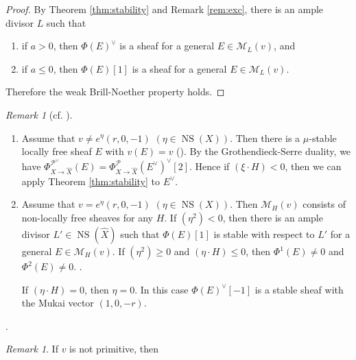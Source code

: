 \documentclass[10pt]{amsart}
\def\cal{\mathcal}
\newenvironment{NB}{
\color{red}{\bf NB}. \footnotesize 
}{}
\newcommand{\NS}{\operatorname{NS}}
\numberwithin{equation}{section}
\theoremstyle{plain}
\theoremstyle{definition}
\theoremstyle{remark}
\newtheorem{rem}[thm]{Remark}
\begin{document}
\begin{proof}
By Theorem \ref{thm:stability} and Remark \ref{rem:exc},
there is an ample divisor $L$ such that 
\begin{enumerate}
\item
if $a>0$, then $\Phi(E)^{\vee}$ is a sheaf for a general $E \in {\cal M}_L(v)$, and
\item
if $a \leq 0$, then $\Phi(E)[1]$ is a sheaf for a general $E \in {\cal M}_L(v)$.
\end{enumerate}
Therefore the weak Brill-Noether property holds.
\end{proof}


\begin{rem}[{cf. \cite[Prop. 3.6]{CNY2}}]
\begin{enumerate}
\item
Assume that $v \ne e^\eta (r,0,-1)$ $(\eta \in \NS(X))$.
Then there is a $\mu$-stable locally free sheaf $E$ with $v(E)=v$ (\cite[Prop. 3.5]{KY}).
By the Grothendieck-Serre duality, we have
$\Phi_{X \to \widehat{X}}^{{\cal P}^{\vee}}(E)=\Phi_{X \to \widehat{X}}^{{\cal P}}(E^{\vee})^{\vee}[2]$.
Hence if $(\xi \cdot H)<0$, then
we can apply Theorem \ref{thm:stability} to $E^{\vee}$.
\item
Assume that $v = e^\eta (r,0,-1)$ $(\eta \in \NS(X))$.
Then ${\cal M}_H(v)$ consists of non-locally free sheaves for any $H$.
If $(\eta^2)<0$, then 
there is an ample divisor $L' \in \NS(\widehat{X})$ such that
$\Phi(E)[1]$ is stable with respect to $L'$ for a general $E \in {\cal M}_H(v)$.
If $(\eta^2) \geq 0$ and $(\eta \cdot H) \leq 0$, then
$\Phi^1(E) \ne 0$ and $\Phi^2(E) \ne 0$.
\begin{NB}
If $(\eta \cdot H)=0$, then $\eta=0$. In this case $\Phi(E)^{\vee}[-1]$ is a stable sheaf 
with the Mukai vector $(1,0,-r)$. 
\end{NB}
\end{enumerate}
\end{rem}



\begin{NB}
\begin{rem}
If $v$ is not primitive, then 
\end{rem}
\end{NB}
\end{document}
